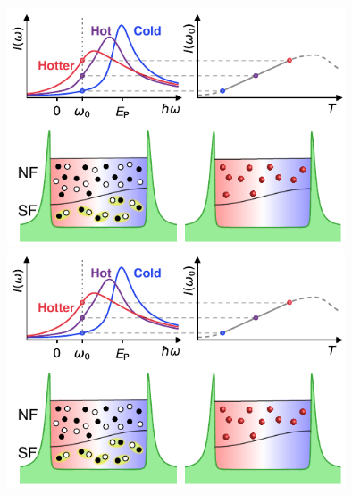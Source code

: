 \documentclass[26pt, paperwidth=36in,paperheight=48in]{tikzposter} %
\begin{document}
\begin{columns}
{		%
		\vspace{0cm}
		\begin{minipage}{0.15\textwidth}
			\includegraphics[width=10cm,
			trim=0cm 0cm 4.4cm 3.2cm,clip]{figures/local_thermometer_redone.pdf}\\
			
			\hspace{0.5cm}\includegraphics[width=10cm,
			trim=4.4cm 0cm 0cm 3.2cm,clip]{figures/local_thermometer_redone.pdf}
		\end{minipage}
		\hspace{-3.5cm}
%			
		\hspace{-0.5cm}
		\vspace{1cm}
	}
	

\end{columns}
\end{document}
